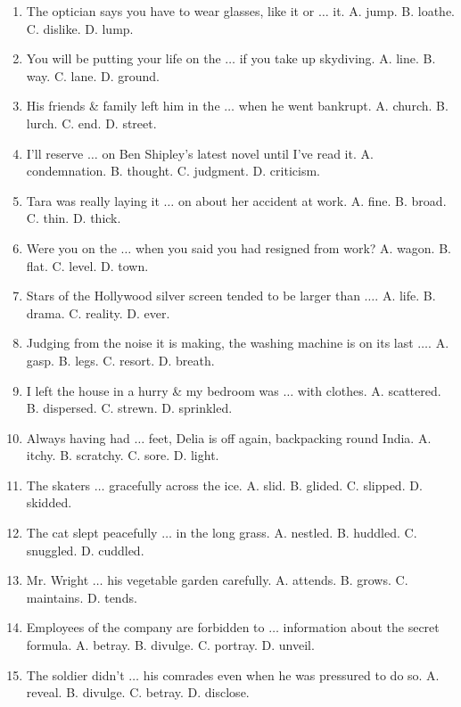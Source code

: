 \documentclass{article}
\numberwithin{equation}{section}
\begin{document}
\begin{enumerate}[leftmargin=2mm]
	\item The optician says you have to wear glasses, like it or $\ldots$ it. {\sf A.} jump. {\sf B.} loathe. {\sf C.} dislike. {\sf D.} lump.
	\item You will be putting your life on the $\ldots$ if you take up skydiving. {\sf A.} line. {\sf B.} way. {\sf C.} lane. {\sf D.} ground.
	\item His friends \& family left him in the $\ldots$ when he went bankrupt. {\sf A.} church. {\sf B.} lurch. {\sf C.} end. {\sf D.} street.
	\item I'll reserve $\ldots$ on Ben Shipley's latest novel until I've read it. {\sf A.} condemnation. {\sf B.} thought. {\sf C.} judgment. {\sf D.} criticism.
	\item Tara was really laying it $\ldots$ on about her accident at work. {\sf A.} fine. {\sf B.} broad. {\sf C.} thin. {\sf D.} thick.
	\item Were you on the $\ldots$ when you said you had resigned from work? {\sf A.} wagon. {\sf B.} flat. {\sf C.} level. {\sf D.} town.
	\item Stars of the Hollywood silver screen tended to be larger than $\ldots$. {\sf A.} life. {\sf B.} drama. {\sf C.} reality. {\sf D.} ever.
	\item Judging from the noise it is making, the washing machine is on its last $\ldots$. {\sf A.} gasp. {\sf B.} legs. {\sf C.} resort. {\sf D.} breath.
	\item I left the house in a hurry \& my bedroom was $\ldots$ with clothes. {\sf A.} scattered. {\sf B.} dispersed. {\sf C.} strewn. {\sf D.} sprinkled.
	\item Always having had $\ldots$ feet, Delia is off again, backpacking round India. {\sf A.} itchy. {\sf B.} scratchy. {\sf C.} sore. {\sf D.} light.
	\item The skaters $\ldots$ gracefully across the ice. {\sf A.} slid. {\sf B.} glided. {\sf C.} slipped. {\sf D.} skidded.
	\item The cat slept peacefully $\ldots$ in the long grass. {\sf A.} nestled. {\sf B.} huddled. {\sf C.} snuggled. {\sf D.} cuddled.
	\item Mr. Wright $\ldots$ his vegetable garden carefully. {\sf A.} attends. {\sf B.} grows. {\sf C.} maintains. {\sf D.} tends.
	\item Employees of the company are forbidden to $\ldots$ information about the secret formula. {\sf A.} betray. {\sf B.} divulge. {\sf C.} portray. {\sf D.} unveil.
	\item The soldier didn't $\ldots$ his comrades even when he was pressured to do so. {\sf A.} reveal. {\sf B.} divulge. {\sf C.} betray. {\sf D.} disclose.

\end{enumerate}
\end{document}

